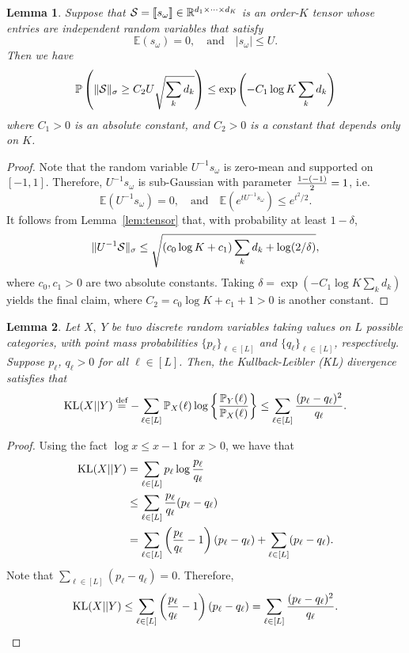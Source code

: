 \documentclass{article}
\theoremstyle{plain}
\newtheorem{lem}{Lemma}
\theoremstyle{definition}
\begin{document}
\begin{lem} \label{lem:noisytensor}
Suppose that $\mathcal{S}=\llbracket s_{\omega} \rrbracket\in\mathbb{R}^{d_1\times \cdots \times d_K}$ is an order-$K$ tensor whose entries are independent random variables that satisfy
\[
\mathbb{E}(s_{\omega})=0,\quad \text{and}\quad |s_{\omega}|\leq U.
\]
Then we have
\[
\mathbb{P}\left(\lVert\mathcal{S}\rVert_\sigma\geq C_2 U\sqrt{\sum_k d_k} \right)\leq \exp\left(-C_1  \log K \sum_k d_k\right)
\]
where $C_1>0$ is an absolute constant, and $C_2>0$ is a constant that depends only on $K$.
\end{lem}

\begin{proof}  Note that the random variable $U^{-1}s_{\omega}$ is zero-mean and supported on $[-1,1]$. Therefore, $U^{-1}s_{\omega}$ is sub-Gaussian with parameter ${1-(-1)\over 2}=1$, i.e.
\[
\mathbb{E}(U^{-1}s_{\omega})=0,\quad \text{and}\quad \mathbb{E}(e^{tU^{-1}s_{\omega}})\leq e^{t^2/2}.
\]
It follows from Lemma~\ref{lem:tensor} that, with probability at least $1-\delta$,
\[
\lVert U^{-1}\mathcal{S}\rVert_\sigma\leq \sqrt{\left(c_0\log K+c_1\right) \sum_k d_k +\log (2/\delta)},
\]
where $c_0, c_1>0$ are two absolute constants. Taking $\delta=\exp (-C_1\log K \sum_k d_k)$ yields the final claim, where $C_2=c_0\log K+c_1+1>0$ is another constant.
\end{proof}


\begin{lem}\label{lem:KLentry} Let $X,\; Y$ be two discrete random variables taking values on $L$ possible categories, with point mass probabilities $\{p_\ell\}_{\ell\in[L]}$ and $\{q_\ell\}_{\ell\in[L]}$, respectively.  Suppose $p_\ell$, $q_\ell>0$ for all $\ell\in[L]$. Then, the Kullback-Leibler (KL) divergence satisfies that
\[
\mathrm{KL}(X||Y)\stackrel{\text{def}}{=}-\sum_{\ell\in[L]}\mathbb{P}_X(\ell)\log\left\{{\mathbb{P}_Y(\ell)\over \mathbb{P}_X(\ell)}\right\} \leq \sum_{\ell \in [L]}{(p_\ell-q_\ell)^2 \over q_\ell}.
\]
\end{lem}
\begin{proof} Using the fact $\log x\leq x-1$ for $x>0$, we have that
\begin{align}\label{eq:KL}
\text{KL}(X||Y)&=\sum_{\ell\in[L]}p_\ell\log{p_\ell\over q_\ell}\\
&\leq \sum_{\ell\in[L]} {p_\ell\over q_\ell}(p_\ell-q_\ell)\\
&=\sum_{\ell\in[L]} \left({p_\ell\over q_\ell }- 1\right)(p_\ell-q_\ell)+ \sum_{\ell\in[L]} (p_\ell-q_\ell).
\end{align}
Note that $\sum_{\ell\in[L]}(p_\ell-q_\ell)=0$. Therefore,
\[
\text{KL}(X||Y)\leq \sum_{\ell\in[L]}\left( {p_\ell\over q_\ell}-1\right)\left(p_\ell-q_\ell\right)=\sum_{\ell\in[L]}{(p_\ell-q_\ell)^2\over q_\ell}.
\]
\end{proof}
\end{document}
